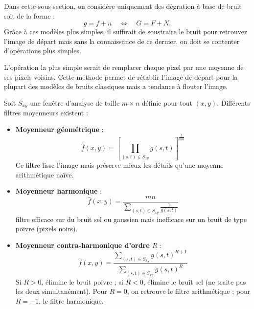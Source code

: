 Dans cette sous-section, on considère uniquement des dégration à base de bruit soit de la forme : 
\begin{equation}
    g = f + n \quad \iff \quad G = F + N. 
\end{equation}
Grâce à ces modèles plus simples, il suffirait de soustraire le bruit pour retrouver l'image de départ mais sans la connaissance de ce dernier, on doit se contenter d'opérations plus simples. 

L'opération la plus simple serait de remplacer chaque pixel par une moyenne de ses pixels voisins. Cette méthode permet de rétablir l'image de départ pour la plupart des modèles de bruits classiques mais a tendance à flouter l'image. 

\begin{proposition}
    Soit $S_{xy}$ une fenêtre d'analyse de taille $ m \times n$ définie pour tout $(x,y)$. Différents filtres moyenneurs existent : 
    \begin{itemize}
        \item \textbf{Moyenneur géométrique} :
            \begin{equation}
                \hat{f}(x,y) = \left[ \prod_{(s,t) \in S_{xy}} g(s,t) \right]^{\frac{1}{mn}}
            \end{equation}
            Ce filtre lisse l'image mais préserve mieux les détails qu'une moyenne arithmétique naïve. 
        \item \textbf{Moyenneur harmonique} :
            \begin{equation}
                \hat{f}(x,y) = \frac{mn}{\displaystyle \sum_{(s,t) \in S_{xy}} \frac{1}{g(s,t)}}
            \end{equation}
            filtre efficace sur du bruit sel ou gaussien mais inefficace sur un bruit de type poivre (pixels noirs). 
        \item \textbf{Moyenneur contra-harmonique d'ordre $R$} :
            \begin{equation}
                {\hat{f}(x,y) = \frac{\displaystyle \sum_{(s,t) \in S_{xy}} g(s,t)^{R+1}}{\displaystyle \sum_{(s,t) \in S_{xy}} g(s,t)^R}}
            \end{equation}
            Si $R > 0$, élimine le bruit poivre ; si $R < 0$, élimine le bruit sel (ne traite pas les deux simultanément). Pour $R = 0$, on retrouve le filtre arithmétique ; pour $R = -1$, le filtre harmonique.
    \end{itemize}
\end{proposition}

